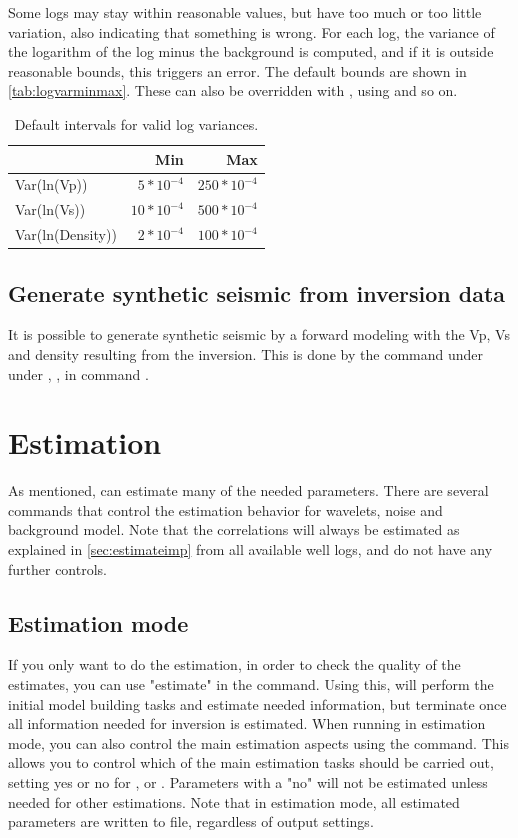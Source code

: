 {Some logs may stay within reasonable values, but have too much or too
little variation, also indicating that something is wrong. For each
log, the variance of the logarithm of the log minus the background is
computed, and if it is outside reasonable bounds, this triggers an
error. The default bounds are shown in
\autoref{tab:logvarminmax}. These can also be overridden with
, using  and so
on. 
\begin{table}
\begin{tabular}{|lrr|}
\hline
& Min & Max \\
\hline
Var(ln(Vp)) & $5*10^{-4}$ & $250*10^{-4}$ \\
Var(ln(Vs)) & $10*10^{-4}$ & $500*10^{-4}$ \\
Var(ln(Density)) & $2*10^{-4}$ & $100*10^{-4}$ \\
\end{tabular}
\caption{Default intervals for valid log variances.\label{tab:logvarminmax}}
\end{table}

\subsection{Generate synthetic seismic from inversion data}
It is possible to generate synthetic seismic by a forward modeling
with the Vp, Vs and density resulting from the inversion. This is done
by the command   under  under
, ,  in command
. 

\section{Estimation}
\label{sec:estimateusr}
As mentioned, \crava can estimate many of the needed parameters. There
are several commands that control the estimation behavior for
wavelets, noise and background model. Note that the correlations will
always be estimated as explained in \autoref{sec:estimateimp} from all
available well logs, and do not have any further controls. 

\subsection{Estimation mode}
If you only want to do the estimation, in order to check the quality
of the estimates, you can use "estimate" in the 
command. Using this, \crava will perform the initial model building
tasks and estimate needed information, but terminate once all
information needed for inversion is estimated. When running in
estimation mode, you can also control the main estimation aspects
using the 
command. This allows you to control which of the main estimation tasks
should be carried out, setting yes or no for
,  or
. Parameters with a "no" will not be estimated
unless needed for other estimations. Note that in estimation mode, all
estimated parameters are written to file, regardless of output
settings. 
}
